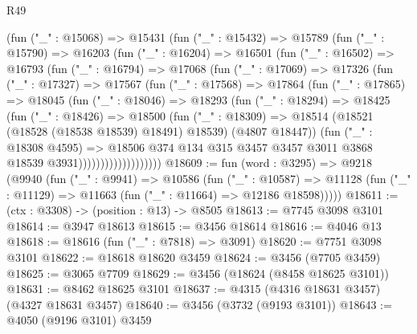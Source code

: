 \begin{lexlean}{R49}
\begin{coremodule}
              (fun ("_" : @15068) =>
              @15431
                (fun ("_" : @15432) =>
                @15789
                  (fun ("_" : @15790) =>
                  @16203
                    (fun ("_" : @16204) =>
                    @16501
                      (fun ("_" : @16502) =>
                      @16793
                        (fun ("_" : @16794) =>
                        @17068
                          (fun ("_" : @17069) =>
                          @17326
                            (fun ("_" : @17327) =>
                            @17567
                              (fun ("_" : @17568) =>
                              @17864
                                (fun ("_" : @17865) =>
                                @18045
                                  (fun ("_" : @18046) =>
                                  @18293
                                    (fun ("_" : @18294) =>
                                    @18425
                                      (fun ("_" : @18426) =>
                                      @18500
                                        (fun ("_" : @18309) =>
                                        @18514
                                          (@18521 (@18528 (@18538 @18539) @18491) @18539)
                                          (@4807 @18447))
                                        (fun ("_" : @18308 @4595) =>
                                        @18506
                                          @374
                                          @134
                                          @315
                                          @3457
                                          @3457
                                          @3011
                                          @3868
                                          @18539
                                          @3931)))))))))))))))))))
@18609 := fun (word : @3295) =>
  @9218
    (@9940
      (fun ("_" : @9941) =>
      @10586
        (fun ("_" : @10587) =>
        @11128 (fun ("_" : @11129) => @11663 (fun ("_" : @11664) => @12186 @18598)))))
@18611 := (ctx : @3308) -> (position : @13) -> @8505
@18613 := @7745 @3098 @3101
@18614 := @3947 @18613
@18615 := @3456 @18614
@18616 := @4046 @13
@18618 := @18616 (fun ("_" : @7818) => @3091)
@18620 := @7751 @3098 @3101
@18622 := @18618 @18620 @3459
@18624 := @3456 (@7705 @3459)
@18625 := @3065 @7709
@18629 := @3456 (@18624 (@8458 @18625 @3101))
@18631 := @8462 @18625 @3101
@18637 := @4315 (@4316 @18631 @3457) (@4327 @18631 @3457)
@18640 := @3456 (@3732 (@9193 @3101))
@18643 := @4050 (@9196 @3101) @3459

\end{coremodule}
\end{lexlean}
